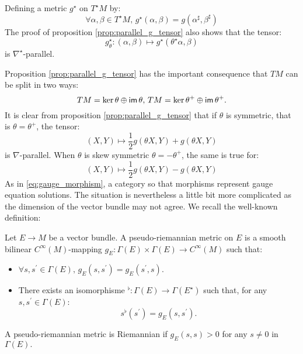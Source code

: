 \begin{rem}
    Defining a metric $g^\star$ on $T^\star M$ by:
\begin{equation}
    \label{eq:g_star_metric}
    \forall \alpha, \beta \in T^\star M, \, g^\star(\alpha,\beta) = g\left(
    \alpha^\sharp, \beta^\sharp
    \right)
\end{equation}
The proof of proposition \ref{prop:parallel_g_tensor} also shows that the tensor:
\[
g_\theta^\star \colon (\alpha,\beta) \mapsto g^\star\left(\theta^\star \alpha, \beta\right)
\]
is $\nabla^\star$-parallel.
\end{rem}
Proposition  \ref{prop:parallel_g_tensor} has the important consequence that $TM$ can be split in two ways:
\begin{equation}
    \label{eq:split_tm}
    TM = \ker \theta \oplus \operatorname{\textsf{im}} \theta , \, TM = \ker \theta^+ \oplus \operatorname{\textsf{im}} \theta^+.
\end{equation}
It is clear from proposition \ref{prop:parallel_g_tensor} that if $\theta$ is symmetric, that is $\theta = \theta^+$, the tensor:
\begin{equation}
(X,Y) \mapsto \frac{1}{2} g\left( \theta X, Y\right) + g\left( \theta X, Y\right)
\end{equation}
is $\nabla$-parallel.
When $\theta$ is skew symmetric $\theta = -\theta^+$, the same is true for:
\begin{equation}
(X,Y) \mapsto \frac{1}{2} g\left( \theta X, Y\right) - g\left( \theta X, Y\right)
\end{equation}
As in \ref{eq:gauge_morphism}, a category so that morphisms represent gauge equation solutions. The situation is nevertheless a little bit more complicated as the dimension of the vector bundle may not agree. 
We recall the well-known definition:
\begin{defn}
\label{def:metric_bundle}
Let $E \rightarrow M$ be a vector bundle. A pseudo-riemannian metric on $E$ is a smooth bilinear $C^{\infty}(M)$-mapping $g_E \colon \Gamma(E) \times \Gamma(E) \to C^\infty(M)$ such that:
\begin{itemize}
\item $\forall s,s^\prime \in \Gamma(E), \, g_E(s,s^\prime) = g_E(s^\prime, s).$
\item There exists an isomorphisme ${}^\flat \colon \Gamma(E) \to \Gamma(E^\star)$ such that, for any $s,s^\prime \in \Gamma(E)$: 
\[
s^\flat(s^\prime) = g_E(s,s^\prime).
\]
\end{itemize}
A pseudo-riemannian metric is Riemannian if $g_E(s,s) > 0$ for any $s\neq 0$ in $\Gamma(E).$
\end{defn}
